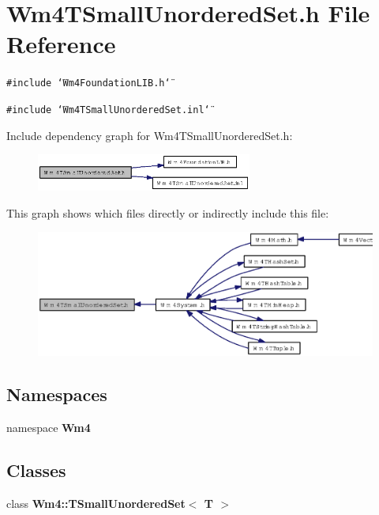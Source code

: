 \section{Wm4TSmall\-Unordered\-Set.h File Reference}
\label{Wm4TSmallUnorderedSet_8h}
{\tt \#include \char`\"{}Wm4Foundation\-LIB.h\char`\"{}}\par
{\tt \#include \char`\"{}Wm4TSmall\-Unordered\-Set.inl\char`\"{}}\par


Include dependency graph for Wm4TSmall\-Unordered\-Set.h:\begin{figure}[H]
\begin{center}
\leavevmode
\includegraphics[width=201pt]{Wm4TSmallUnorderedSet_8h__incl}
\end{center}
\end{figure}


This graph shows which files directly or indirectly include this file:\begin{figure}[H]
\begin{center}
\leavevmode
\includegraphics[width=381pt]{Wm4TSmallUnorderedSet_8h__dep__incl}
\end{center}
\end{figure}
\subsection*{Namespaces}
\begin{CompactItemize}
\item 
namespace {\bf Wm4}
\end{CompactItemize}
\subsection*{Classes}
\begin{CompactItemize}
\item 
class {\bf Wm4::TSmall\-Unordered\-Set$<$ T $>$}
\end{CompactItemize}
